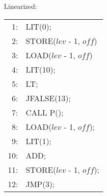 \begin{minipage}{0.5\textwidth}
Linearized:

\vspace{6mm}
\begin{tabular}{rl}
    1:& LIT(0); \\
    2:& STORE($lev$ - 1, $off$) \\
    3:& LOAD($lev$ - 1, $off$) \\
    4:& LIT(10); \\
    5:& LT; \\
    6:& JFALSE(13); \\
    7:& CALL P(); \\
    8:& LOAD($lev$ - 1, $off$); \\
    9:& LIT(1); \\
    10:& ADD; \\
    11:& STORE($lev$ - 1, $off$); \\
    12:& JMP(3); \\
\end{tabular}
\end{minipage}